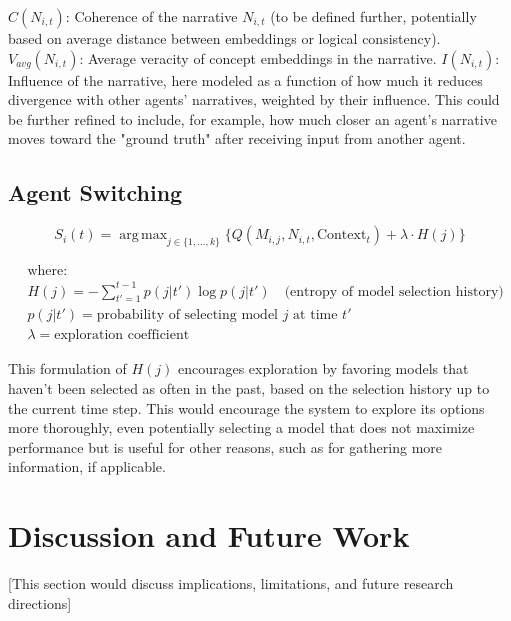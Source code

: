 \documentclass[12pt, a4paper]{article}
\DeclareMathOperator*{\argmax}{arg\,max}
\begin{document}
$C(N_{i,t})$: Coherence of the narrative $N_{i,t}$ (to be defined further, potentially based on average distance between embeddings or logical consistency).
$V_{avg}(N_{i,t})$: Average veracity of concept embeddings in the narrative.
$I(N_{i,t})$: Influence of the narrative, here modeled as a function of how much it reduces divergence with other agents' narratives, weighted by their influence. This could be further refined to include, for example, how much closer an agent's narrative moves toward the "ground truth" after receiving input from another agent.

\subsection{Agent Switching}


\begin{equation}
S_i(t) = \argmax_{j \in \{1, \dots, k\}} \{Q(M_{i,j}, N_{i,t}, \text{Context}_t) + \lambda \cdot H(j)\}
\end{equation}

\begin{equation}
\begin{aligned}
& \text{where:} \\
& H(j) = -\sum_{t'=1}^{t-1} p(j|t') \log p(j|t') \quad \text{(entropy of model selection history)} \\
& p(j|t') = \text{probability of selecting model } j \text{ at time } t' \\
& \lambda = \text{exploration coefficient}
\end{aligned}
\end{equation}

This formulation of $H(j)$ encourages exploration by favoring models that haven't been selected as often in the past, based on the selection history up to the current time step. This would encourage the system to explore its options more thoroughly, even potentially selecting a model that does not maximize performance but is useful for other reasons, such as for gathering more information, if applicable.











\section{Discussion and Future Work}
[This section would discuss implications, limitations, and future research directions]
\end{document}
